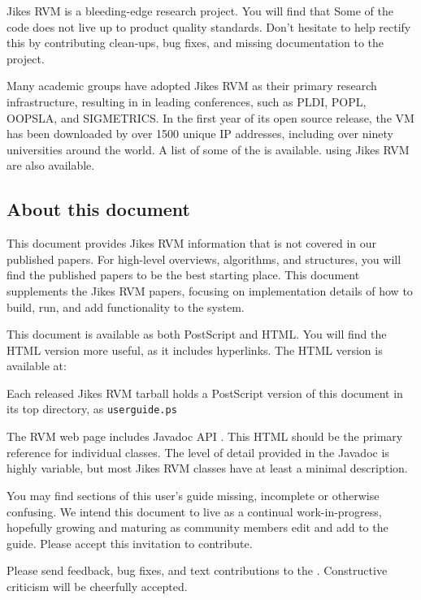 Jikes RVM is a bleeding-edge research project.  You will find that
Some of the code does not live up to product quality standards.  Don't
hesitate to help rectify this by contributing clean-ups, bug fixes,
and missing documentation to the project.

Many academic groups have adopted Jikes RVM as their primary research
infrastructure, resulting in
in leading
conferences, such as PLDI, POPL, OOPSLA, and SIGMETRICS.  In the first year
of its open source release, the VM has been downloaded by over
1500 unique IP addresses, including over ninety
universities around the world. A list
of some of the  is available.
 using
Jikes RVM are also available.

\JikesTMFooter

\JavaTMFooter

\subsection{About this document}

This document provides Jikes\TMweb{} RVM information that is not
covered in our published papers.  For high-level overviews,
algorithms, and structures, you will find the published papers to be
the best starting place. This document supplements the Jikes RVM
papers, focusing on implementation details of how to build, run,
and add functionality to the system.

This document is available as both PostScript\R{} and HTML.  You will find the
HTML version more useful, as it includes hyperlinks. The HTML version is
available at:
\begin{example}
\xlink{{\tt \RVMUserGuideURL}}{\RVMUserGuideURL}
\end{example}
Each released Jikes RVM tarball holds a PostScript version of this
document in its top directory, as {\tt userguide.ps}


The RVM web page includes Javadoc\TM{} API 
. 
This HTML should be the primary reference for individual classes. The
level of detail provided in the Javadoc is highly variable, but most
Jikes RVM classes have at least a minimal description.

You may find sections of this user's guide missing, incomplete or
otherwise confusing. We intend this document to live as a continual
work-in-progress, hopefully growing and maturing as community members
edit and add to the guide.  Please accept this invitation to
contribute.

Please send feedback, bug fixes, and text contributions to the 
.  
Constructive criticism will be cheerfully accepted. 

\JikesTMFooter
